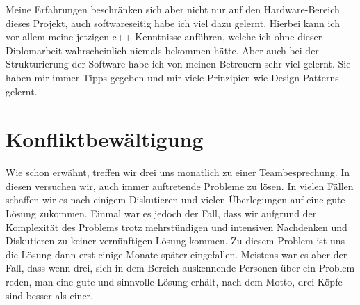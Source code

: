 Meine Erfahrungen beschränken sich aber nicht nur auf den Hardware-Bereich dieses Projekt, auch softwareseitig habe ich viel dazu gelernt.
Hierbei kann ich vor allem meine jetzigen c++ Kenntnisse anführen, welche ich ohne dieser Diplomarbeit wahrscheinlich niemals bekommen hätte.
Aber auch bei der Strukturierung der Software habe ich von meinen Betreuern sehr viel gelernt.
Sie haben mir immer Tipps gegeben und mir viele Prinzipien wie Design-Patterns gelernt.


\section{Konfliktbewältigung}
Wie schon erwähnt, treffen wir drei uns monatlich zu einer Teambesprechung. In diesen versuchen wir, auch immer auftretende Probleme zu lösen.
In vielen Fällen schaffen wir es nach einigem Diskutieren und vielen Überlegungen auf eine gute Lösung zukommen.
Einmal war es jedoch der Fall, dass wir aufgrund der Komplexität des Problems trotz mehrstündigen und intensiven Nachdenken und Diskutieren zu keiner vernünftigen Lösung kommen.
Zu diesem Problem ist uns die Lösung dann erst einige Monate später eingefallen.
Meistens war es aber der Fall, dass wenn drei, sich in dem Bereich auskennende Personen über ein Problem reden, man eine gute und sinnvolle Lösung erhält, nach dem Motto, drei Köpfe sind besser als einer.